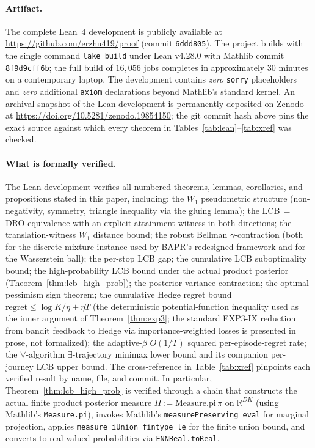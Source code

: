 \documentclass[11pt]{article}
\theoremstyle{definition}
\theoremstyle{remark}
\begin{document}
\paragraph{Artifact.}
The complete Lean~4 development is publicly available at
\url{https://github.com/erzhu419/proof} (commit \texttt{6ddd805}).
The project builds with the single command \texttt{lake build} under
Lean v4.28.0 with Mathlib commit \texttt{8f9d9cff6b}; the full build
of $16{,}056$ jobs completes in approximately 30 minutes on a
contemporary laptop. The development contains \emph{zero}
\texttt{sorry} placeholders and \emph{zero} additional \texttt{axiom}
declarations beyond Mathlib's standard kernel. An archival snapshot
of the Lean development is permanently deposited on Zenodo at
\url{https://doi.org/10.5281/zenodo.19854150}; the
git commit hash above pins the exact source against which every
theorem in Tables~\ref{tab:lean}--\ref{tab:xref} was checked.

\paragraph{What is formally verified.}
The Lean development verifies all numbered theorems, lemmas,
corollaries, and propositions stated in this paper, including:
the $W_1$ pseudometric structure (non-negativity, symmetry, triangle
inequality via the gluing lemma); the LCB$\,=\,$DRO equivalence
with an explicit attainment witness in both directions; the
translation-witness $W_1$ distance bound; the robust Bellman
$\gamma$-contraction (both for the discrete-mixture instance used by
BAPR's redesigned framework and for the Wasserstein ball); the
per-stop LCB gap; the cumulative LCB suboptimality bound; the
high-probability LCB bound under the actual product posterior
(Theorem~\ref{thm:lcb_high_prob}); the posterior variance contraction;
the optimal pessimism sign theorem; the cumulative Hedge regret bound
$\mathrm{regret} \leq \log K / \eta + \eta T$ (the deterministic
potential-function inequality used as the inner argument of
Theorem~\ref{thm:exp3}; the standard EXP3-IX reduction from bandit
feedback to Hedge via importance-weighted losses is presented in
prose, not formalized); the adaptive-$\beta$
$O(1/T)$ squared per-episode-regret rate; the $\forall$-algorithm
$\exists$-trajectory minimax lower bound and its companion
per-journey LCB upper bound.
The cross-reference in Table~\ref{tab:xref} pinpoints each verified
result by name, file, and commit. In particular,
Theorem~\ref{thm:lcb_high_prob} is verified through a chain that
constructs the actual finite product posterior measure
$\Pi := \mathrm{Measure.pi}\,\pi$ on $\mathbb{R}^{DK}$ (using
Mathlib's \texttt{Measure.pi}), invokes Mathlib's
\texttt{measurePreserving\_eval} for marginal projection, applies
\texttt{measure\_iUnion\_fintype\_le} for the finite union bound,
and converts to real-valued probabilities via \texttt{ENNReal.toReal}.
\end{document}
